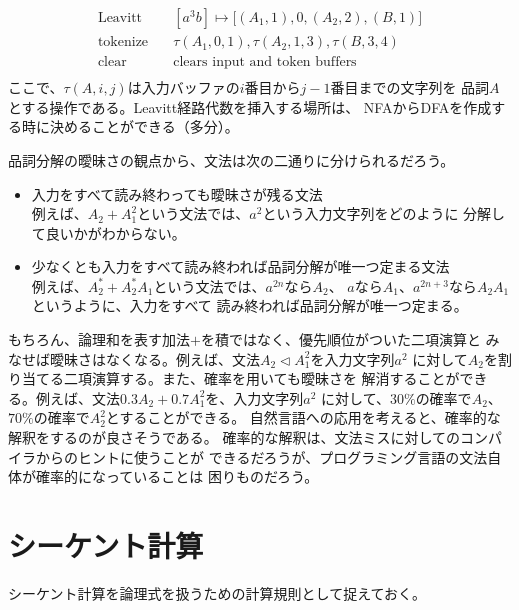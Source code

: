 {	\begin{equation*}\begin{split}
		\text{Leavitt}\quad
		& [a^3b] \mapsto \bigl[(A_1,1), 0 , (A_2,2) , (B,1) \bigr] \\
		\text{tokenize}\quad & \tau(A_1,0,1), \tau(A_2,1,3), \tau(B,3,4) \\
		\text{clear}\quad & \text{clears input and token buffers} \\
	\end{split}\end{equation*}
	ここで、$\tau(A,i,j)$は入力バッファの$i$番目から$j-1$番目までの文字列を
	品詞$A$とする操作である。Leavitt経路代数を挿入する場所は、
	NFAからDFAを作成する時に決めることができる（多分）。

	品詞分解の曖昧さの観点から、文法は次の二通りに分けられるだろう。
	\begin{itemize}\setlength{\itemsep}{-1mm} %
		\item 入力をすべて読み終わっても曖昧さが残る文法 \\
		例えば、$A_2+A_1^2$という文法では、$a^2$という入力文字列をどのように
		分解して良いかがわからない。
		\item 少なくとも入力をすべて読み終われば品詞分解が唯一つ定まる文法 \\
		例えば、$A_2^*+A_2^*A_1$という文法では、$a^{2n}$なら$A_2$、
		$a$なら$A_1$、$a^{2n+3}$なら$A_2A_1$というように、入力をすべて
		読み終われば品詞分解が唯一つ定まる。
	\end{itemize} %
	もちろん、論理和を表す加法$+$を積ではなく、優先順位がついた二項演算と
	みなせば曖昧さはなくなる。例えば、文法$A_2\lhd A_1^2$を入力文字列$a^2$
	に対して$A_2$を割り当てる二項演算する。また、確率を用いても曖昧さを
	解消することができる。例えば、文法$0.3A_2+0.7A_1^2$を、入力文字列$a^2$
	に対して、$30\%$の確率で$A_2$、$70\%$の確率で$A_2^2$とすることができる。
	自然言語への応用を考えると、確率的な解釈をするのが良さそうである。
	確率的な解釈は、文法ミスに対してのコンパイラからのヒントに使うことが
	できるだろうが、プログラミング言語の文法自体が確率的になっていることは
	困りものだろう。
\section{シーケント計算}\label{s1:シーケント計算} %
	シーケント計算を論理式を扱うための計算規則として捉えておく。

}

